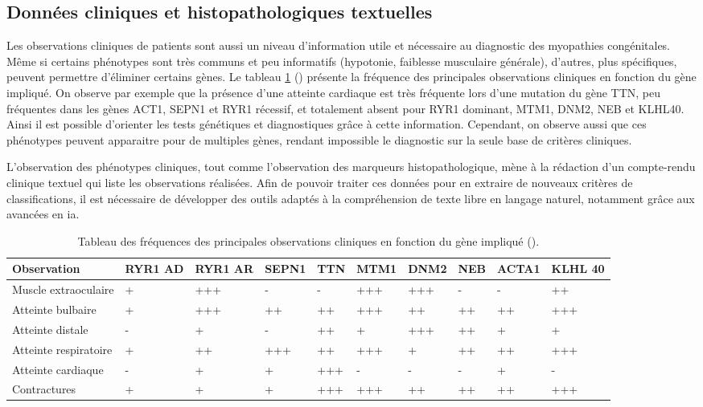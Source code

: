 \subsection{Données cliniques et histopathologiques textuelles }
Les observations cliniques de patients sont aussi un niveau d'information utile et nécessaire au diagnostic des myopathies congénitales. Même si certains phénotypes sont très communs et peu informatifs (hypotonie, faiblesse musculaire générale), d'autres, plus spécifiques, peuvent permettre d'éliminer certains gènes. Le tableau \ref{tab:clinic} (\cite{jungbluth_congenital_2018}) présente la fréquence des principales observations cliniques en fonction du gène impliqué. On observe par exemple que la présence d'une atteinte cardiaque est très fréquente lors d'une mutation du gène TTN, peu fréquentes dans les  gènes ACT1, SEPN1 et RYR1 récessif, et totalement absent pour RYR1 dominant, MTM1, DNM2, NEB et KLHL40. Ainsi il est possible d'orienter les tests génétiques et diagnostiques grâce à cette information. Cependant, on observe aussi que ces phénotypes peuvent apparaitre pour de multiples gènes, rendant impossible le diagnostic sur la seule base de critères cliniques.

L'observation des phénotypes cliniques, tout comme l'observation des marqueurs histopathologique, mène à la rédaction d'un compte-rendu clinique textuel qui liste les observations réalisées. Afin de pouvoir traiter ces données pour en extraire de nouveaux critères de classifications, il est nécessaire de développer des outils adaptés à la compréhension de texte libre en langage naturel, notamment grâce aux avancées en \gls{ia}. 

\begin{table}[!ht]
\begin{tabularx}{\textwidth}{|p{1.8cm}|X|X|X|X|X|X|X|X|X|}
 \hline
\textbf{Observation} & \textbf{RYR1 AD} & \textbf{RYR1 AR} & \textbf{SEPN1} & \textbf{TTN} & \textbf{MTM1} & \textbf{DNM2} & \textbf{NEB} & \textbf{ACTA1} & \textbf{KLHL 40} \\
\hline
Muscle extraoculaire & + & +++ & - & - & +++ & +++ & - & - & ++ \\
\hline
Atteinte bulbaire & + & +++ & ++ & ++ & +++ & ++ & ++ & ++ & +++ \\
\hline
Atteinte distale  & - & + & - & ++ & + & +++ & ++ & + & + \\
\hline
Atteinte respiratoire & + & ++ & +++ & ++ & +++ & + & ++ & ++ & +++ \\
\hline
Atteinte cardiaque & - & + & + & +++ & - & - & - & + & - \\
\hline
Contractures & + & + & + & +++ & +++ & ++ & ++ & ++ & +++ \\
\hline
\end{tabularx}
\caption{Tableau des fréquences des principales observations cliniques en fonction du gène impliqué (\cite{jungbluth_congenital_2018}). }
\label{tab:clinic}
\end{table}

